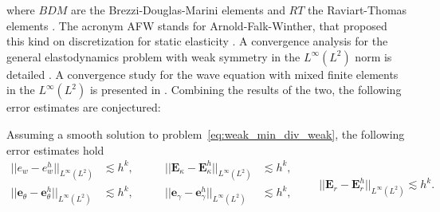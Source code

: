 where $BDM$ are the Brezzi-Douglas-Marini elements \cite{brezzi1985bdm} and $RT$ the Raviart-Thomas elements \cite{raviart1977}. The acronym AFW stands for Arnold-Falk-Winther, that proposed this kind on discretization for static elasticity \cite{arnold2007mixed}. A convergence analysis for the general elastodynamics problem with weak symmetry in the $L^\infty (L^2)$ norm is detailed \cite{arnold2014elastodynamics}. A convergence study for the wave equation with mixed finite elements in the $L^\infty (L^2)$ is presented in \cite{geveci1988}. Combining the results of the two, the following error estimates are conjectured:
\begin{conjecture}\label{conj:AWFestimates}
	Assuming a smooth solution to problem~\eqref{eq:weak_min_div_weak}, the following error estimates hold 
	\begin{equation}
	\label{eq:errAFW}
	\begin{aligned}
	||e_w - e_w^h||_{L^{\infty}(L^2)} &\lesssim h^{k}, \\
	||\bm{e}_\theta - \bm{e}_\theta^h||_{L^{\infty}(L^2)} &\lesssim h^{k}, \\
	\end{aligned} \qquad
	\begin{aligned}
	||\bm{E}_\kappa - \bm{E}_\kappa^h||_{L^{\infty}(L^2)} &\lesssim  h^{k}, \\
	||\bm{e}_\gamma - \bm{e}_\gamma^ h||_{L^{\infty}(L^2)} &\lesssim  h^{k}, \\
	\end{aligned} \qquad
	||\bm{E}_r - \bm{E}_r^h||_{L^{\infty}(L^2)} \lesssim h^{k}. 
	\end{equation}
\end{conjecture}


